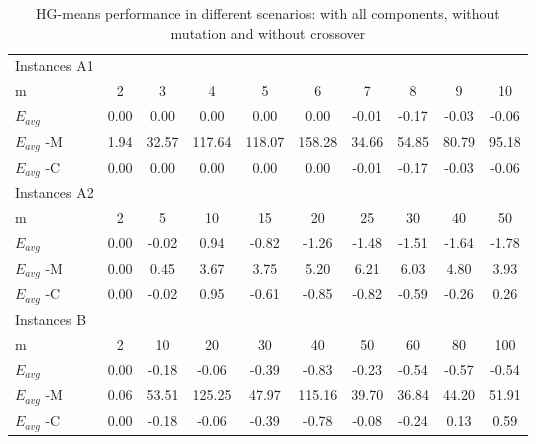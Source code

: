 \begin{table}[H]
\centering
\begin{tabular}{lccccccccc}
\hline
Instances A1 &      &       &        &        &        &       &       &       &       \\
m            & 2    & 3     & 4      & 5      & 6      & 7     & 8     & 9     & 10    \\
$E_{avg}$    & 0.00 & 0.00  & 0.00   & 0.00   & 0.00   & -0.01 & -0.17 & -0.03 & -0.06 \\
$E_{avg}$ -M & 1.94 & 32.57 & 117.64 & 118.07 & 158.28 & 34.66 & 54.85 & 80.79 & 95.18 \\
$E_{avg}$ -C & 0.00 & 0.00  & 0.00   & 0.00   & 0.00   & -0.01 & -0.17 & -0.03 & -0.06 \\ \hline
Instances A2 &      &       &        &        &        &       &       &       &       \\
m            & 2    & 5     & 10     & 15     & 20     & 25    & 30    & 40    & 50    \\
$E_{avg}$    & 0.00 & -0.02 & 0.94   & -0.82  & -1.26  & -1.48 & -1.51 & -1.64 & -1.78 \\
$E_{avg}$ -M & 0.00 & 0.45  & 3.67   & 3.75   & 5.20   & 6.21  & 6.03  & 4.80  & 3.93  \\
$E_{avg}$ -C & 0.00 & -0.02 & 0.95   & -0.61  & -0.85  & -0.82 & -0.59 & -0.26 & 0.26  \\ \hline
Instances B  &      &       &        &        &        &       &       &       &       \\
m            & 2    & 10    & 20     & 30     & 40     & 50    & 60    & 80    & 100   \\
$E_{avg}$    & 0.00 & -0.18 & -0.06  & -0.39  & -0.83  & -0.23 & -0.54 & -0.57 & -0.54 \\
$E_{avg}$ -M & 0.06 & 53.51 & 125.25 & 47.97  & 115.16 & 39.70 & 36.84 & 44.20 & 51.91 \\
$E_{avg}$ -C & 0.00 & -0.18 & -0.06  & -0.39  & -0.78  & -0.08 & -0.24 & 0.13  & 0.59  \\ \hline
\end{tabular}
\caption{HG-means performance in different scenarios: with all components, without mutation and without crossover}
\label{comp}
\end{table}